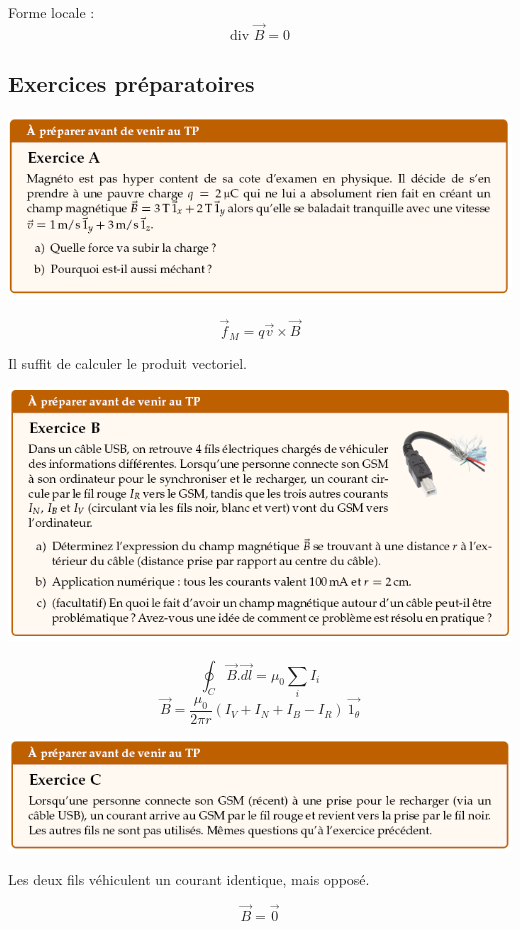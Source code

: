 \documentclass	[11pt, a4paper, openany]{book}
\newcommand{\divv}{\text{div}\,}
\begin{document}
Forme locale : $$ \divv\,\vec B = 0$$






	\subsection{Exercices préparatoires}
\begin{center}
\includegraphics[scale=0.85]{prepa/magneto1.png}\\
\end{center}
$$\vec{f}_M = q\vec{v} \times \vec{B}$$
\begin{center}
Il suffit de calculer le produit vectoriel.
\end{center}


\begin{center}
\includegraphics[scale=0.85]{prepa/magneto2.png}\\
\end{center}

$$\oint_C \vec{B}.\vec{dl} = \mu_0 \sum_i I_i$$
$$\vec{B} = \frac{\mu_0}{2\pi r}\left(I_V + I_N + I_B - I_R\right)\ \vec{1_\theta}$$




\newpage
\begin{center}
\includegraphics[scale=0.85]{prepa/magneto3.png}\\
\end{center}
\begin{center}
Les deux fils véhiculent un courant identique, mais opposé.
\end{center}
$$\vec{B} = \vec{0}$$
\end{document}
